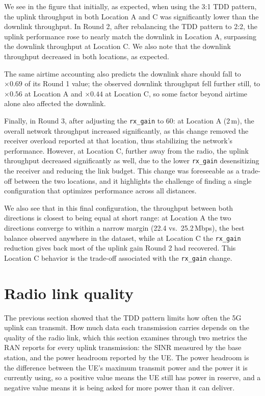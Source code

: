 We see in the figure that initially, as expected, when using the 3:1 \gls{TDD} pattern, the uplink throughput in both Location A and C was significantly lower than the downlink throughput. In Round 2, after rebalancing the \gls{TDD} pattern to 2:2, the uplink performance rose to nearly match the downlink in Location A, surpassing the downlink throughput at Location C. We also note that the downlink throughput decreased in both locations, as expected.

The same airtime accounting also predicts the downlink share should fall to $\times0.69$ of its Round 1 value; the observed downlink throughput fell further still, to $\times0.56$ at Location A and $\times0.44$ at Location C, so some factor beyond airtime alone also affected the downlink.

Finally, in Round 3, after adjusting the \texttt{rx\_gain} to 60: at Location A (2\,m), the overall network throughput increased significantly, as this change removed the receiver overload reported at that location, thus stabilizing the network's performance. However, at Location C, further away from the radio, the uplink throughput decreased significantly as well, due to the lower \texttt{rx\_gain} desensitizing the receiver and reducing the link budget. This change was foreseeable as a trade-off between the two locations, and it highlights the challenge of finding a single configuration that optimizes performance across all distances.

We also see that in this final configuration, the throughput between both directions is closest to being equal at short range: at Location A the two directions converge to within a narrow margin (22.4 vs.\ 25.2\,Mbps), the best balance observed anywhere in the dataset, while at Location C the \texttt{rx\_gain} reduction gives back most of the uplink gain Round 2 had recovered. This Location C behavior is the trade-off associated with the \texttt{rx\_gain} change.


\section{Radio link quality}
\label{sec:radio-link-quality}

The previous section showed that the \gls{TDD} pattern limits how often the 5G uplink can transmit. How much data each transmission carries depends on the quality of the radio link, which this section examines through two metrics the \gls{RAN} reports for every uplink transmission: the \gls{SINR} measured by the base station, and the power headroom reported by the \gls{UE}. The power headroom is the difference between the \gls{UE}'s maximum transmit power and the power it is currently using, so a positive value means the \gls{UE} still has power in reserve, and a negative value means it is being asked for more power than it can deliver.

